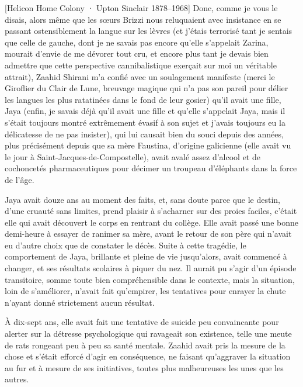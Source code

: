 %
%
[Helicon Home Colony · Upton Sinclair \textup{1878--1968}]%
Donc, comme je vous le disais, alors même que les sœurs Brizzi nous reluquaient avec insistance en se passant ostensiblement la langue sur les lèvres (et j’étais terrorisé tant je sentais que celle de gauche, dont je ne savais pas encore qu’elle s’appelait Zarina, mourait d’envie de me dévorer tout cru, et encore plus tant je devais bien admettre que cette perspective cannibalistique exerçait sur moi un véritable attrait), Zaahid Shirani m’a confié avec un soulagement manifeste (merci le Giroflier du Clair de Lune, breuvage magique qui n’a pas son pareil pour délier les langues les plus ratatinées dans le fond de leur gosier) qu’il avait une fille, Jaya (enfin, je savais déjà qu’il avait une fille et qu’elle s’appelait Jaya, mais il s’était toujours montré extrêmement évasif à son sujet et j’avais toujours eu la délicatesse de ne pas insister), qui lui causait bien du souci depuis des années, plus précisément depuis que sa mère Faustina, d’origine galicienne (elle avait vu le jour à Saint-Jacques-de-Compostelle), avait avalé assez d’alcool et de cochoncetés pharmaceutiques pour décimer un troupeau d’éléphants dans la force de l’âge.

Jaya avait douze ans au moment des faits, et, sans doute parce que le destin, d’une cruauté sans limites, prend plaisir à s’acharner sur des proies faciles, c’était elle qui avait découvert le corps en rentrant du collège. Elle avait passé une bonne demi-heure à essayer de ranimer sa mère, avant le retour de son père qui n’avait eu d’autre choix que de constater le décès. Suite à cette tragédie, le comportement de Jaya, brillante et pleine de vie jusqu’alors, avait commencé à changer, et ses résultats scolaires à piquer du nez. Il aurait pu s’agir d’un épisode transitoire, somme toute bien compréhensible dans le contexte, mais la situation, loin de s’améliorer, n’avait fait qu’empirer, les tentatives pour enrayer la chute n’ayant donné strictement aucun résultat.

À dix-sept ans, elle avait fait une tentative de suicide peu convaincante pour alerter sur la détresse psychologique qui ravageait son existence, telle une meute de rats rongeant peu à peu sa santé mentale. Zaahid avait pris la mesure de la chose et s’était efforcé d’agir en conséquence, ne faisant qu’aggraver la situation au fur et à mesure de ses initiatives, toutes plus malheureuses les unes que les autres.

